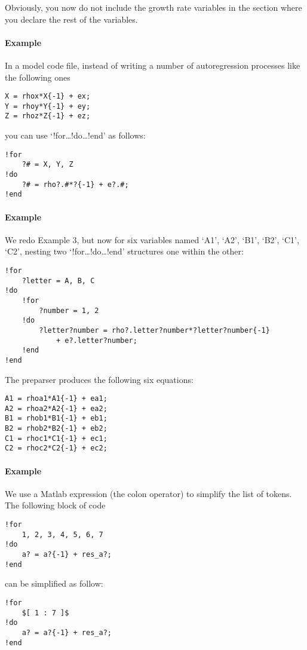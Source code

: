 Obviously, you now do not include the growth rate variables in the
section where you declare the rest of the variables.

\paragraph{Example}

In a model code file, instead of writing a number of autoregression
processes like the following ones

\begin{verbatim}
X = rhox*X{-1} + ex;
Y = rhoy*Y{-1} + ey;
Z = rhoz*Z{-1} + ez;
\end{verbatim}

you can use `!for\ldots{}!do\ldots{}!end' as follows:

\begin{verbatim}
!for
    ?# = X, Y, Z
!do
    ?# = rho?.#*?{-1} + e?.#;
!end
\end{verbatim}

\paragraph{Example}

We redo Example 3, but now for six variables named `A1', `A2', `B1',
`B2', `C1', `C2', nesting two `!for\ldots{}!do\ldots{}!end' structures
one within the other:

\begin{verbatim}
!for
    ?letter = A, B, C
!do
    !for
        ?number = 1, 2
    !do
        ?letter?number = rho?.letter?number*?letter?number{-1}
            + e?.letter?number;
    !end
!end
\end{verbatim}

The preparser produces the following six equations:

\begin{verbatim}
A1 = rhoa1*A1{-1} + ea1;
A2 = rhoa2*A2{-1} + ea2;
B1 = rhob1*B1{-1} + eb1;
B2 = rhob2*B2{-1} + eb2;
C1 = rhoc1*C1{-1} + ec1;
C2 = rhoc2*C2{-1} + ec2;
\end{verbatim}

\paragraph{Example}

We use a Matlab expression (the colon operator) to simplify the list of
tokens. The following block of code

\begin{verbatim}
!for
    1, 2, 3, 4, 5, 6, 7
!do
    a? = a?{-1} + res_a?;
!end
\end{verbatim}

can be simplified as follow:

\begin{verbatim}
!for
    $[ 1 : 7 ]$
!do
    a? = a?{-1} + res_a?;
!end
\end{verbatim}



